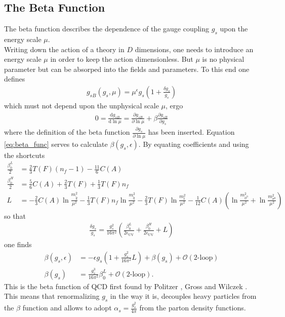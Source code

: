 \subsection{The Beta Function}\label{sec:beta_function}
The beta function describes the dependence of the gauge coupling $g_s$ upon the energy scale $\mu$.\\
Writing down the action of a theory in $D$ dimensions, one needs to introduce an energy scale $\mu$ in order to keep the action dimensionless. But $\mu$ is no physical parameter but can be absorped into the fields and parameters. To this end one defines
\begin{align}
g_{sB}(g_s, \mu) = \mu^\epsilon g_s \left( 1 + \frac{\delta g_s}{g_s} \right)
\end{align}
which must not depend upon the unphysical scale $\mu$, ergo
\begin{align}
0 = \frac{\mathrm{d}g_{sB}}{\mathrm{d}\ln\mu} = \frac{\partial g_{sB}}{\partial \ln\mu} + \beta \frac{\partial g_{sB}}{\partial g_s}\label{eq:beta_func}
\end{align}
where the definition of the beta function $\frac{\partial g_s}{\partial\ln\mu}$ has been inserted. Equation \eqref{eq:beta_func} serves to calculate $\beta(g_s,\epsilon)$.  By equating coefficients and using the shortcuts
\begin{align*}
\frac{\beta_0^L}{2} &= \frac{2}{3}T(F)(n_f-1) - \frac{11}{6}C(A)\\
\frac{\beta_0^H}{2} &= \frac{5}{6}C(A) + \frac{2}{3}T(F) + \frac{1}{3}T(F)n_f\\
L &= - \frac{2}{3} C(A) \ln \frac{m_{\tilde{g}}^2}{\mu^2} - \frac{1}{3}T(F)n_f \ln \frac{m_{\tilde{q}}^2}{\mu^2} - \frac{2}{3}T(F) \ln \frac{m_t^2}{\mu^2}-\frac{1}{12} C(A) \left( \ln \frac{m_{\phi^0}^2}{\mu^2} + \ln \frac{m_{\sigma^0}^2}{\mu^2} \right)
\end{align*}
so that 
\begin{align}
\frac{\delta g_s}{g_s} = \frac{g_s^2}{16\pi^2}\left( \frac{\beta^L_0}{2\epsilon_{\mathrm{UV}}} + \frac{\beta^H_0}{2\epsilon_{\mathrm{UV}}} + L \right)
\end{align}
one finds
\begin{align}
\beta(g_s,\epsilon) &= -\epsilon g_s \left( 1 + \frac{g_s^2}{16\pi^2} L \right) + \beta(g_s) + \mathcal{O}(\mbox{2-loop})\\
\beta(g_s) &= \frac{g_s^3}{16\pi^2} \beta_0^L + \mathcal{O}(\mbox{2-loop}).
\end{align}
This is the beta function of QCD first found by Politzer \cite{Politzer:1973fx}, Gross and Wilczek \cite{Gross:1973ju}. This means that renormalizing $g_s$ in the way it is, decouples heavy particles from the $\beta$ function and allows to adopt $\alpha_s = \frac{g_s^2}{4\pi}$ from the parton density functions.




